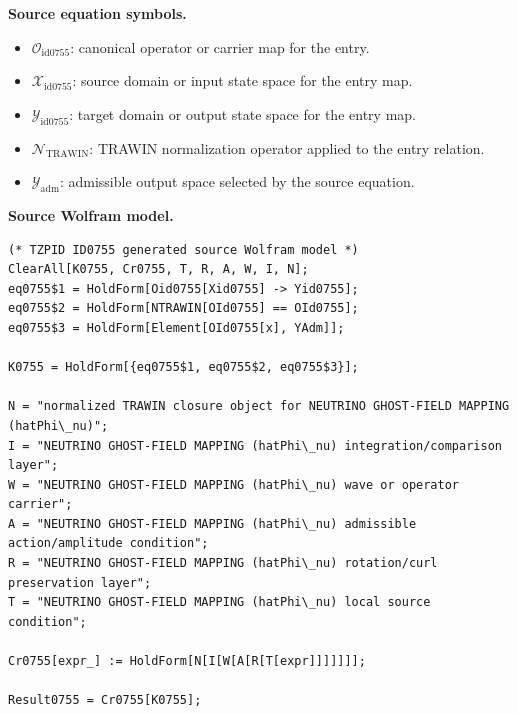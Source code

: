 \begin{minipage}[t]{0.49\linewidth}
\begingroup
\small
\raggedright
\textbf{Source equation symbols.}\par
\begin{itemize}[leftmargin=1.35em,itemsep=1pt,topsep=1pt,parsep=0pt]
    \item $\mathcal{O}_{\mathrm{id0755}}$: canonical operator or carrier map for the entry.
    \item $\mathcal{X}_{\mathrm{id0755}}$: source domain or input state space for the entry map.
    \item $\mathcal{Y}_{\mathrm{id0755}}$: target domain or output state space for the entry map.
    \item $\mathcal{N}_{\mathrm{TRAWIN}}$: TRAWIN normalization operator applied to the entry relation.
    \item $\mathcal{Y}_{\mathrm{adm}}$: admissible output space selected by the source equation.
\end{itemize}
\endgroup
\end{minipage}\hfill
\begin{minipage}[t]{0.47\linewidth}
\begingroup
\scriptsize
\raggedright
\textbf{Source Wolfram model.}\par
\begin{Verbatim}[fontsize=\tiny,breaklines=true,breakanywhere=true]
(* TZPID ID0755 generated source Wolfram model *)
ClearAll[K0755, Cr0755, T, R, A, W, I, N];
eq0755$1 = HoldForm[Oid0755[Xid0755] -> Yid0755];
eq0755$2 = HoldForm[NTRAWIN[OId0755] == OId0755];
eq0755$3 = HoldForm[Element[OId0755[x], YAdm]];

K0755 = HoldForm[{eq0755$1, eq0755$2, eq0755$3}];

N = "normalized TRAWIN closure object for NEUTRINO GHOST-FIELD MAPPING (hatPhi\_nu)";
I = "NEUTRINO GHOST-FIELD MAPPING (hatPhi\_nu) integration/comparison layer";
W = "NEUTRINO GHOST-FIELD MAPPING (hatPhi\_nu) wave or operator carrier";
A = "NEUTRINO GHOST-FIELD MAPPING (hatPhi\_nu) admissible action/amplitude condition";
R = "NEUTRINO GHOST-FIELD MAPPING (hatPhi\_nu) rotation/curl preservation layer";
T = "NEUTRINO GHOST-FIELD MAPPING (hatPhi\_nu) local source condition";

Cr0755[expr_] := HoldForm[N[I[W[A[R[T[expr]]]]]]];

Result0755 = Cr0755[K0755];
\end{Verbatim}
\endgroup
\end{minipage}

